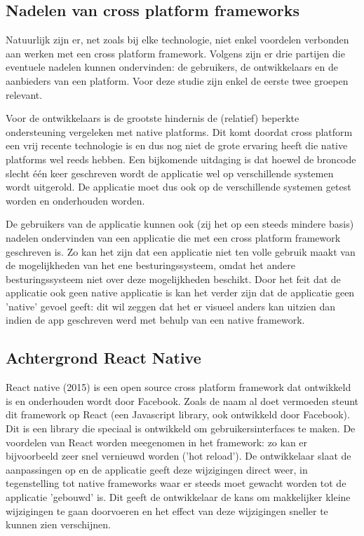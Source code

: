 \subsection{Nadelen van cross platform frameworks}

Natuurlijk zijn er, net zoals bij elke technologie, niet enkel voordelen verbonden aan werken met een cross platform framework. Volgens \textcite{Corral2012} zijn er drie partijen die eventuele nadelen kunnen ondervinden: de gebruikers, de ontwikkelaars en de aanbieders van een platform. Voor deze studie zijn enkel de eerste twee groepen relevant.

Voor de ontwikkelaars is de grootste hindernis de (relatief) beperkte ondersteuning vergeleken met native platforms. Dit komt doordat cross platform een vrij recente technologie is en dus nog niet de grote ervaring heeft die native platforms wel reeds hebben. Een bijkomende uitdaging is dat hoewel de broncode slecht één keer geschreven wordt de applicatie wel op verschillende systemen wordt uitgerold. De applicatie moet dus ook op de verschillende systemen getest worden en onderhouden worden.

De gebruikers van de applicatie kunnen ook (zij het op een steeds mindere basis) nadelen ondervinden van een applicatie die met een cross platform framework geschreven is. Zo kan het zijn dat een applicatie niet ten volle gebruik maakt van de mogelijkheden van het ene besturingssysteem, omdat het andere besturingssysteem niet over deze mogelijkheden beschikt. Door het feit dat de applicatie ook geen native applicatie is kan het verder zijn dat de applicatie geen 'native' gevoel geeft: dit wil zeggen dat het er visueel anders kan uitzien dan indien de app geschreven werd met behulp van een native framework.

\subsection{Achtergrond React Native}

React native (2015) is een open source cross platform framework dat ontwikkeld is en onderhouden wordt door Facebook. Zoals de naam al doet vermoeden steunt dit framework op React (een Javascript library, ook ontwikkeld door Facebook). Dit is een library die speciaal is ontwikkeld om gebruikersinterfaces te maken. De voordelen van React worden meegenomen in het framework: zo kan er bijvoorbeeld zeer snel vernieuwd worden ('hot reload'). De ontwikkelaar slaat de aanpassingen op en de applicatie geeft deze wijzigingen direct weer, in tegenstelling tot native frameworks waar er steeds moet gewacht worden tot de applicatie 'gebouwd' is. Dit geeft de ontwikkelaar de kans om makkelijker kleine wijzigingen te gaan doorvoeren en het effect van deze wijzigingen sneller te kunnen zien verschijnen.

